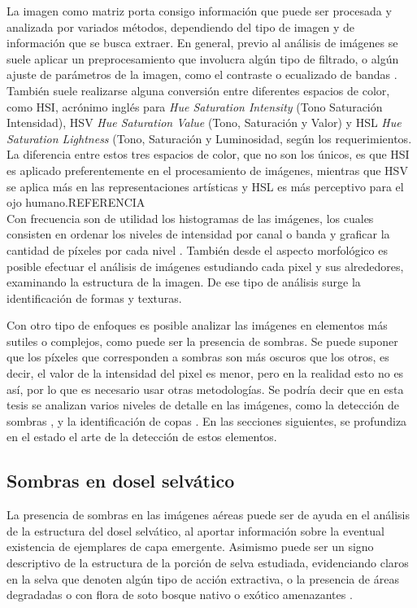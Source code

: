 La imagen como matriz porta consigo información que puede ser procesada y analizada por variados métodos, dependiendo del tipo de imagen y de información que se busca extraer. En general, previo al análisis de imágenes se suele aplicar un preprocesamiento que involucra algún tipo de filtrado, o algún ajuste de parámetros de la imagen, como el contraste o ecualizado de bandas \cite{sonka_image_1993}. También suele realizarse alguna conversión entre diferentes espacios de color, como HSI, acrónimo inglés para \textit{Hue Saturation Intensity} (Tono Saturación Intensidad), HSV \textit{Hue Saturation Value} (Tono, Saturación y Valor) y HSL \textit{Hue Saturation Lightness} (Tono, Saturación y Luminosidad,  según los requerimientos. La diferencia entre estos tres espacios de color, que no son los únicos, es que HSI es aplicado preferentemente en el procesamiento de imágenes, mientras que HSV se aplica más en las representaciones artísticas y HSL es más perceptivo para el ojo humano.REFERENCIA\\

Con frecuencia son de utilidad los histogramas de las imágenes, los cuales consisten en ordenar los niveles de intensidad por canal o banda y graficar la cantidad de píxeles por cada nivel \cite{atienza_histograma_nodate}. También desde el aspecto morfológico es posible efectuar el análisis de imágenes estudiando cada pixel y sus alrededores, examinando la estructura de la imagen. De ese tipo de análisis surge la identificación de formas y texturas.

Con otro tipo de enfoques es posible analizar las imágenes en elementos más sutiles o complejos, como puede ser la presencia de sombras. Se puede suponer que los píxeles que corresponden a sombras son más oscuros que los otros, es decir, el valor de la intensidad del pixel es menor, pero en la realidad esto no es así, por lo que es necesario usar otras metodologías. 
Se podría decir que en esta tesis se analizan varios niveles de detalle en las imágenes, como la detección de sombras \cite{bernhardt_identification_2023}, y la identificación de copas \cite{hubert_wagner_individual_2018}.
En las secciones siguientes, se profundiza en el estado el arte de la detección de estos elementos.

\subsection{Sombras en dosel selvático}
La presencia de sombras en las imágenes aéreas puede ser de ayuda en el análisis de la estructura del dosel selvático, al aportar información sobre la eventual existencia de ejemplares de capa emergente. Asimismo puede ser un signo descriptivo de la estructura de la porción de selva estudiada, evidenciando claros en la selva que denoten algún tipo de acción extractiva, o la presencia de áreas degradadas o con flora de soto bosque nativo o exótico amenazantes \cite{bedrij_selective_2022}.


